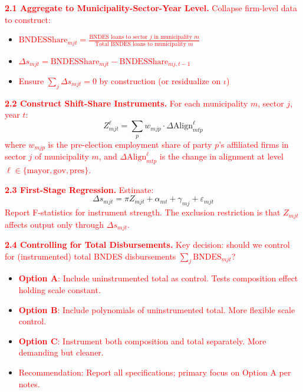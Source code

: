 \documentclass{article}
\begin{document}
\textcolor{red}{\textbf{2.1 Aggregate to Municipality-Sector-Year Level.} Collapse firm-level data to construct:}
\begin{itemize}
    \item \textcolor{red}{$\text{BNDESShare}_{mjt} = \frac{\text{BNDES loans to sector } j \text{ in municipality } m}{\text{Total BNDES loans to municipality } m}$}
    \item \textcolor{red}{$\Delta s_{mjt} = \text{BNDESShare}_{mjt} - \text{BNDESShare}_{mj,t-1}$}
    \item \textcolor{red}{Ensure $\sum_j \Delta s_{mjt} = 0$ by construction (or residualize on $\iota$)}
\end{itemize}

\textcolor{red}{\textbf{2.2 Construct Shift-Share Instruments.} For each municipality $m$, sector $j$, year $t$:}
\begin{equation*}
    Z^{\ell}_{mjt} = \sum_p w_{mjp} \cdot \Delta \text{Align}^{\ell}_{mtp}
\end{equation*}
\textcolor{red}{where $w_{mjp}$ is the pre-election employment share of party $p$'s affiliated firms in sector $j$ of municipality $m$, and $\Delta \text{Align}^{\ell}_{mtp}$ is the change in alignment at level $\ell \in \{\text{mayor}, \text{gov}, \text{pres}\}$.}

\textcolor{red}{\textbf{2.3 First-Stage Regression.} Estimate:}
\begin{equation*}
    \Delta s_{mjt} = \pi Z_{mjt} + \alpha_{mt} + \gamma_{mj} + \varepsilon_{mjt}
\end{equation*}
\textcolor{red}{Report F-statistics for instrument strength. The exclusion restriction is that $Z_{mjt}$ affects output only through $\Delta s_{mjt}$.}

\textcolor{red}{\textbf{2.4 Controlling for Total Disbursements.} Key decision: should we control for (instrumented) total BNDES disbursements $\sum_j \text{BNDES}_{mjt}$?}
\begin{itemize}
    \item \textcolor{red}{\textbf{Option A}: Include uninstrumented total as control. Tests composition effect holding scale constant.}
    \item \textcolor{red}{\textbf{Option B}: Include polynomials of uninstrumented total. More flexible scale control.}
    \item \textcolor{red}{\textbf{Option C}: Instrument both composition and total separately. More demanding but cleaner.}
    \item \textcolor{red}{Recommendation: Report all specifications; primary focus on Option A per notes.}
\end{itemize}
\end{document}

